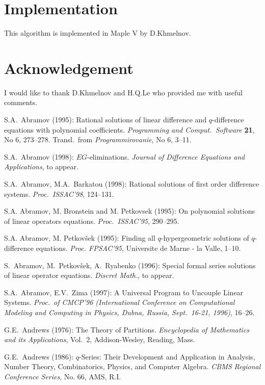 \section{Implementation}
This algorithm is implemented in Maple V by D.Khmelnov.
\section*{Acknowledgement} I would like to thank D.Khmelnov
and H.Q.Le who provided me with useful comments.
\begin{thebibliography}{99}

S.A.~Abramov (1995):
Rational solutions of li\-near dif\-fe\-ren\-ce and
$q$-dif\-fe\-ren\-ce  eq\-ua\-ti\-ons with polynomial coefficients.
{\em Programming and Comput.\ Software\/} {\bf 21}, No 6, 273--278.
Transl.\
from {\em Programmirovanie}, No 6, 3--11.

S.A.~Abramov (1998):
$EG$-eliminations. {\em Journal of
Difference Equations and Applications}, to appear.

S.A.~Abramov, M.A.~Barkatou (1998):
Rational solutions of first order difference systems.
{\em Proc.~ISSAC'98}, 124--131.

 S.A. Abramov, M. Bronstein and M. Petkovsek (1995):
 On polynomial solutions of linear
operators equations.
{\em Proc.\ ISSAC'95}, 290--295.

 S.A. Abramov, M. Petkov\v sek (1995): Finding all
$q$-hypergeometric solutions of $q$-difference equations.
{\em Proc. FPSAC'95}, Universite de Marne - la  Valle, 1--10.

S.~Abramov, M.~Petkov\v sek, A.~Ryabenko (1996):
Special formal series solutions of linear operator equations.
{\em Discret Math.}, to appear.


S.A.~Abramov, E.V.~Zima (1997):
A Universal Program to Uncouple Linear Systems.
{\em Proc.~of CMCP'96 (International Conference on Computational Modeling
and Computing in Physics, Dubna, Russia, Sept.~16-21, 1996)}, 16--26.

G.E.~Andrews (1976): {The Theory of Partitions}. {\em Encyclopedia of
Mathematics and its Applications}, Vol.\ 2, Addison-Wesley, Reading,
Mass.

G.E.~Andrews (1986): {
$q$-Series: Their Development and Application in Analysis, Number
Theory, Combinatorics, Physics, and Computer Algebra}.
{\em CBMS Regional Conference Series}, No. 66, AMS, R.I.


\end{thebibliography}
